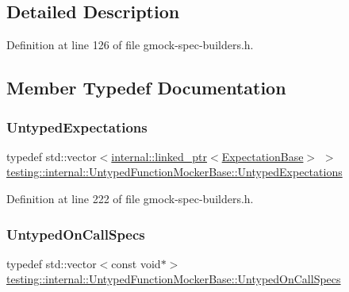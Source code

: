 \subsection{Detailed Description}


Definition at line 126 of file gmock-\/spec-\/builders.\+h.



\subsection{Member Typedef Documentation}
\mbox{\label{classtesting_1_1internal_1_1UntypedFunctionMockerBase_a36480bd395e110b4eae5b0d0402de966}} 
\subsubsection{\texorpdfstring{Untyped\+Expectations}{UntypedExpectations}}
{\footnotesize\ttfamily typedef std\+::vector$<$\hyperlink{classtesting_1_1internal_1_1linked__ptr}{internal\+::linked\+\_\+ptr}$<$\hyperlink{classtesting_1_1internal_1_1ExpectationBase}{Expectation\+Base}$>$ $>$ \hyperlink{classtesting_1_1internal_1_1UntypedFunctionMockerBase_a36480bd395e110b4eae5b0d0402de966}{testing\+::internal\+::\+Untyped\+Function\+Mocker\+Base\+::\+Untyped\+Expectations}\hspace{0.3cm}{\ttfamily [protected]}}



Definition at line 222 of file gmock-\/spec-\/builders.\+h.

\mbox{\label{classtesting_1_1internal_1_1UntypedFunctionMockerBase_a29cc87ed60ad0218432aa777abba7dbb}} 
\subsubsection{\texorpdfstring{Untyped\+On\+Call\+Specs}{UntypedOnCallSpecs}}
{\footnotesize\ttfamily typedef std\+::vector$<$const void$\ast$$>$ \hyperlink{classtesting_1_1internal_1_1UntypedFunctionMockerBase_a29cc87ed60ad0218432aa777abba7dbb}{testing\+::internal\+::\+Untyped\+Function\+Mocker\+Base\+::\+Untyped\+On\+Call\+Specs}\hspace{0.3cm}{\ttfamily [protected]}}



